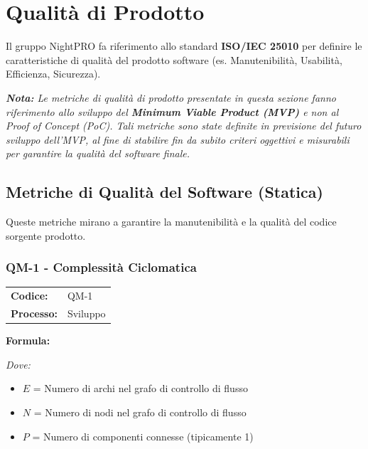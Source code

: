 \documentclass[a4paper,11pt,oneside]{scrartcl}
\begin{document}
\newpage


\section{Qualità di Prodotto}

Il gruppo NightPRO fa riferimento allo standard \textbf{ISO/IEC 25010}{\scriptsize{}} per definire le caratteristiche di qualità del prodotto software (es. Manutenibilità, Usabilità, Efficienza, Sicurezza).

\vspace{0.3cm}
\noindent\textit{\textbf{Nota:} Le metriche di qualità di prodotto presentate in questa sezione fanno riferimento allo sviluppo del \textbf{Minimum Viable Product (MVP)}{\scriptsize{}} e non al Proof of Concept (PoC){\scriptsize{}}. Tali metriche sono state definite in previsione del futuro sviluppo dell'MVP, al fine di stabilire fin da subito criteri oggettivi e misurabili per garantire la qualità del software finale.}
\vspace{0.3cm}

\subsection{Metriche di Qualità del Software (Statica)}
Queste metriche mirano a garantire la manutenibilità e la qualità del codice sorgente prodotto.

\subsubsection{QM-1 - Complessità Ciclomatica}

\noindent
\begin{tabular}{@{}p{}p{}@{}}
    \textbf{Codice:}   & QM-1     \\
    \textbf{Processo:} & Sviluppo \\
\end{tabular}

\vspace{0.3cm}
\noindent\textbf{Formula:}

\noindent\textit{Dove:}
\begin{itemize}[leftmargin=1.5cm, topsep=0pt, itemsep=0pt]
    \item $E$ = Numero di archi nel grafo di controllo di flusso
    \item $N$ = Numero di nodi nel grafo di controllo di flusso
    \item $P$ = Numero di componenti connesse (tipicamente 1)
\end{itemize}
\end{document}

